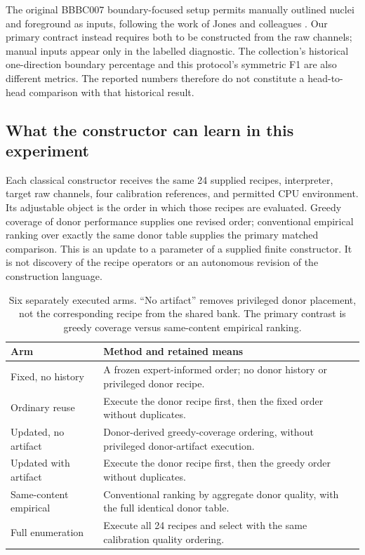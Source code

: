 The original BBBC007 boundary-focused setup permits manually outlined nuclei and foreground as inputs, following the work of Jones and colleagues \citep{bbbc007,jones2005}. Our primary contract instead requires both to be constructed from the raw channels; manual inputs appear only in the labelled diagnostic. The collection's historical one-direction boundary percentage and this protocol's symmetric F1 are also different metrics. The reported numbers therefore do not constitute a head-to-head comparison with that historical result.

\subsection{What the constructor can learn in this experiment}

Each classical constructor receives the same 24 supplied recipes, interpreter, target raw channels, four calibration references, and permitted CPU environment. Its adjustable object is the order in which those recipes are evaluated. Greedy coverage of donor performance supplies one revised order; conventional empirical ranking over exactly the same donor table supplies the primary matched comparison. This is an update to a parameter of a supplied finite constructor. It is not discovery of the recipe operators or an autonomous revision of the construction language.

\begin{table}[htbp]
\centering\small
\begin{tabularx}{\linewidth}{@{}P{1.55in}Y@{}}
\toprule
\textbf{Arm} & \textbf{Method and retained means}\\
\midrule
Fixed, no history & A frozen expert-informed order; no donor history or privileged donor recipe.\\
Ordinary reuse & Execute the donor recipe first, then the fixed order without duplicates.\\
Updated, no artifact & Donor-derived greedy-coverage ordering, without privileged donor-artifact execution.\\
Updated with artifact & Execute the donor recipe first, then the greedy order without duplicates.\\
Same-content empirical & Conventional ranking by aggregate donor quality, with the full identical donor table.\\
Full enumeration & Execute all 24 recipes and select with the same calibration quality ordering.\\
\bottomrule
\end{tabularx}
\caption{Six separately executed arms. ``No artifact'' removes privileged donor placement, not the corresponding recipe from the shared bank. The primary contrast is greedy coverage versus same-content empirical ranking.}
\label{tab:six-arms}
\end{table}

